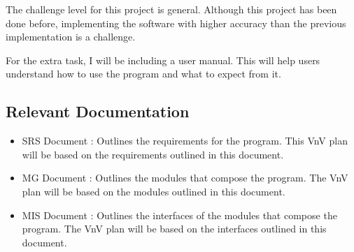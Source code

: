 \documentclass[12pt, titlepage]{article}
\begin{document}
The challenge level for this project is general. Although this project has been
done before, implementing the software with higher accuracy than the previous
implementation is a challenge.

For the extra task, I will be including a user manual. This will help users
understand how to use the program and what to expect from it.



\subsection{Relevant Documentation}


  \begin{itemize}
    \item SRS Document \citep{SRS}: Outlines the requirements for the \progname{}
    program. This VnV plan will be based on the requirements outlined in this
    document.
    \item MG Document \citep{MG}: Outlines the modules that compose the \progname{} program.
    The VnV plan will be based on the modules outlined in this document.
    \item MIS Document \citep{MIS}: Outlines the interfaces of the modules that compose the
    \progname{} program. The VnV plan will be based on the interfaces outlined in
    this document.
  \end{itemize}
\end{document}
